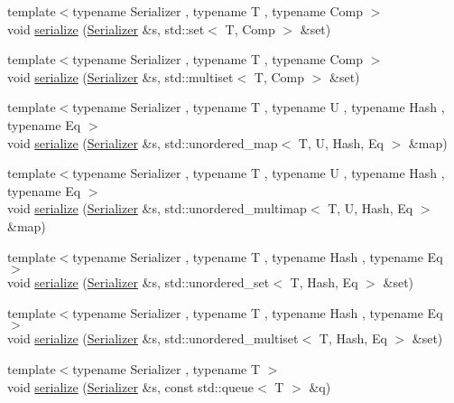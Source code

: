 \begin{DoxyCompactItemize}
\item 
{\footnotesize template$<$typename Serializer , typename T , typename Comp $>$ }\\void \hyperlink{namespacecheckpoint_a9f1869781f4cce4db94c144174680b24}{serialize} (\hyperlink{structcheckpoint_1_1_serializer}{Serializer} \&s, std\+::set$<$ T, Comp $>$ \&set)
\item 
{\footnotesize template$<$typename Serializer , typename T , typename Comp $>$ }\\void \hyperlink{namespacecheckpoint_ae032265314cdf8e9155a6bbc423ca1c9}{serialize} (\hyperlink{structcheckpoint_1_1_serializer}{Serializer} \&s, std\+::multiset$<$ T, Comp $>$ \&set)
\item 
{\footnotesize template$<$typename Serializer , typename T , typename U , typename Hash , typename Eq $>$ }\\void \hyperlink{namespacecheckpoint_a9fc2f3eb20d3ce8d6145e99a2559ea58}{serialize} (\hyperlink{structcheckpoint_1_1_serializer}{Serializer} \&s, std\+::unordered\+\_\+map$<$ T, U, Hash, Eq $>$ \&map)
\item 
{\footnotesize template$<$typename Serializer , typename T , typename U , typename Hash , typename Eq $>$ }\\void \hyperlink{namespacecheckpoint_aa77eeb7a036d253ef33ed2c9ef764a5e}{serialize} (\hyperlink{structcheckpoint_1_1_serializer}{Serializer} \&s, std\+::unordered\+\_\+multimap$<$ T, U, Hash, Eq $>$ \&map)
\item 
{\footnotesize template$<$typename Serializer , typename T , typename Hash , typename Eq $>$ }\\void \hyperlink{namespacecheckpoint_ae4ca8cbc6daf2f5a2a20d44d9fe1cc9f}{serialize} (\hyperlink{structcheckpoint_1_1_serializer}{Serializer} \&s, std\+::unordered\+\_\+set$<$ T, Hash, Eq $>$ \&set)
\item 
{\footnotesize template$<$typename Serializer , typename T , typename Hash , typename Eq $>$ }\\void \hyperlink{namespacecheckpoint_a64c8a1aa29d469bc71c88a8836264ecc}{serialize} (\hyperlink{structcheckpoint_1_1_serializer}{Serializer} \&s, std\+::unordered\+\_\+multiset$<$ T, Hash, Eq $>$ \&set)
\item 
{\footnotesize template$<$typename Serializer , typename T $>$ }\\void \hyperlink{namespacecheckpoint_a5621e2549443d76acad6c83fdfdcbeab}{serialize} (\hyperlink{structcheckpoint_1_1_serializer}{Serializer} \&s, const std\+::queue$<$ T $>$ \&q)
\item 

\end{DoxyCompactItemize}
